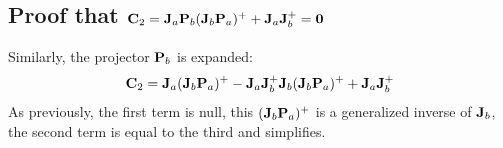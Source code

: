 \documentclass[journal]{IEEEtran}
\begin{document}
\subsection{Proof that ${\mathbf{C}}_2 = {\mathbf{J}}_{a} {\mathbf{P}}_{b} ({\mathbf{J}}_{b} {\mathbf{P}}_{a} )^+ + {\mathbf{J}}_{a} {\mathbf{J}}_{b}^+ = {\mathbf{0}}$}
Similarly, the projector ${\mathbf{P}}_{b}$ is expanded:
\[
{\mathbf{C}}_2 = {\mathbf{J}}_{a} ({\mathbf{J}}_{b} {\mathbf{P}}_{a} )^+ - {\mathbf{J}}_{a} {\mathbf{J}}_{b}^+{\mathbf{J}}_{b} ({\mathbf{J}}_{b} {\mathbf{P}}_{a} )^+ + {\mathbf{J}}_{a} {\mathbf{J}}_{b}^+
\]
As previously, the first term is null, this $({\mathbf{J}}_{b} {\mathbf{P}}_{a} )^+$ is a generalized inverse of ${\mathbf{J}}_{b}$, the second term is equal to the third and simplifies. \QED





\ifCLASSOPTIONcaptionsoff
  \newpage
\fi





%
%
%



% 
\end{document}
